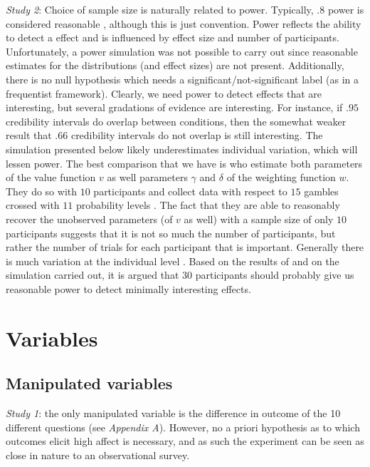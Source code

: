 \documentclass[12pt]{article}
\begin{document}
\emph{Study 2}: Choice of sample
size is naturally related to
power. Typically, $.8$ power is considered reasonable
\autocite{cohen1992power},
although this is just convention. Power reflects the
ability to detect a effect and is influenced by
effect size and number of participants.
Unfortunately, a power simulation was not possible
to carry out since reasonable estimates for the
distributions (and effect sizes) are not present.
Additionally, there is no null hypothesis which
needs a significant/not-significant label (as
in a frequentist framework). Clearly, we need
power to detect effects that are interesting,
but several gradations of evidence are interesting.
For instance, if $.95$ credibility intervals do overlap
between conditions,
then the somewhat weaker result that  $.66$
credibility intervals do not overlap is still
interesting.
The simulation presented below likely underestimates
individual variation, which will lessen power.
The best comparison that we have is
\textcite{gonzalez1999shape} who estimate both
parameters of the value function $v$ as well
parameters $\gamma$ and  $\delta$ of the weighting
function  $w$. They do so with  $10$ participants and
collect data with respect to $15$ gambles crossed
with  $11$ probability levels \autocite{gonzalez1999shape}.
The fact that they are able to reasonably recover
the unobserved parameters (of  $v$ as well) with
a sample size of only $10$ participants suggests
that it is not so much the number of participants,
but rather the number of trials for each participant
that is important. Generally there is much
variation at the individual level
\autocite{gonzalez1999shape,
wu1996curvature,
abdellaoui2010separating}.
Based on the results of
\textcite{gonzalez1999shape}
and on the simulation carried
out, it is argued that $30$ participants should
probably give us reasonable power to detect
minimally interesting effects.

\section{Variables}

\subsection{Manipulated variables}

\emph{Study 1}: the only manipulated
variable is the difference in outcome
of the 10 different questions (see \emph{Appendix A}).
However, no a priori hypothesis as to which
outcomes elicit high affect is necessary,
and as such the experiment can be seen as
close in nature to an observational survey. \\
\end{document}
